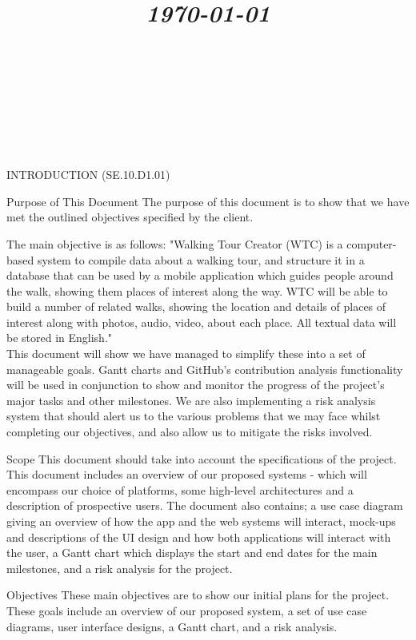 \documentclass{article}
\title{
	\vspace{1.2in}
	\textmd{\textbf{\doctitle}} \\
	\vspace{0.1in}\large{\textit{\today}} \\
	\vspace{0.4in}
	{\bf{\qanumber}} \\ \vspace{0.4in} %
	\version \\
	\status \\
	\vspace{0.4in}
}
\author{\authors}
\date{}
\newcommand{\qanumber}{SE.10.D1}
\begin{document}
	\maketitle
	\newpage
	\tableofcontents
	\newpage

	\begin{section}{INTRODUCTION (\qanumber.01)}
		\begin{subsection}{Purpose of This Document}
			The purpose of this document is to show that we have met the outlined objectives specified by the client. 

The main objective is as follows: "Walking Tour Creator (WTC) is a computer-based system to compile data about a walking tour, and structure it in a database that can be used by a mobile application which guides people around the walk, showing them places of interest along the way. WTC will be able to build a number of related walks, showing the location and details of places of interest along with photos, audio, video, about each place. All textual data will be stored in English." \\

This document will show we have managed to simplify these into a set of manageable goals. Gantt charts and GitHub's contribution analysis functionality will be used in conjunction to show and monitor the progress of the project's major tasks and other milestones. We are also implementing a risk analysis system that should alert us to the various problems that we may face whilst completing our objectives, and also allow us to mitigate the risks involved.
		\end{subsection}
	
		\begin{subsection}{Scope}
			This document should take into account the specifications of the project. This document includes an overview of our proposed systems - which will encompass our choice of platforms, some high-level architectures and a description of prospective users. The document also contains; a use case diagram giving an overview of how the app and the web systems will interact, mock-ups and descriptions of the UI design and how both applications will interact with the user, a Gantt chart which displays the start and end dates for the main milestones, and a risk analysis for the project.
		\end{subsection}
		
		\begin{subsection}{Objectives}
			These main objectives are to show our initial plans for the project. These goals include an overview of our proposed system, a set of use case diagrams, user interface designs, a Gantt chart, and a risk analysis.
			

\end{subsection}
\end{section}
\end{document}
